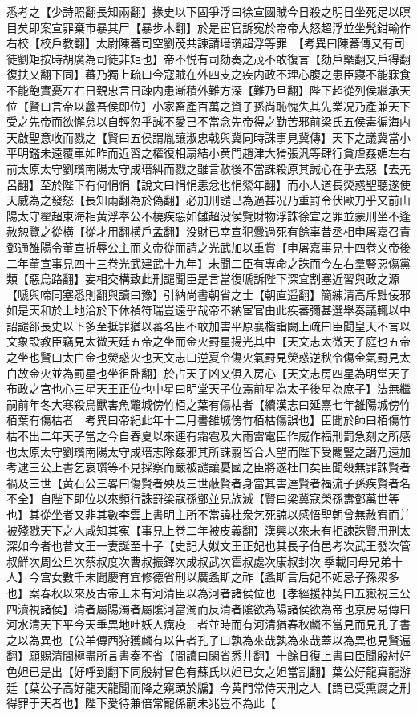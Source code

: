 悉考之【少詩照翻長知兩翻】掾史以下固爭浮曰徐宣國賊今日殺之明日坐死足以瞑目矣即案宣罪棄市暴其尸【暴步木翻】於是宦官訴寃於帝帝大怒超浮並坐髠鉗輸作右校【校戶教翻】太尉陳蕃司空劉茂共諫請瑨瓆超浮等罪　【考異曰陳蕃傳又有司徒劉矩按時胡廣為司徒非矩也】帝不悦有司劾奏之茂不敢復言【劾戶槩翻又戶得翻復扶又翻下同】蕃乃獨上疏曰今寇賊在外四支之疾内政不理心腹之患臣寢不能寐食不能飽實憂左右日親忠言日疎内患漸積外難方深【難乃旦翻】陛下超從列侯繼承天位【賢曰言帝以蠡吾侯即位】小家畜產百萬之資子孫尚恥愧失其先業况乃產兼天下受之先帝而欲懈怠以自輕忽乎誠不愛已不當念先帝得之勤苦邪前梁氏五侯毒徧海内天啟聖意收而戮之【賢曰五侯謂胤讓淑忠戟與冀同時誅事見冀傳】天下之議冀當小平明鑑未遠覆車如昨而近習之權復相扇結小黄門趙津大猾張汎等肆行貪虐姦媚左右前太原太守劉瓆南陽太守成瑨糾而戮之雖言赦後不當誅殺原其誠心在乎去惡【去羌呂翻】至於陛下有何悁悁【說文曰悁悁恚忿也悁縈年翻】而小人道長熒惑聖聽遂使天威為之發怒【長知兩翻為於偽翻】必加刑譴已為過甚况乃重罸令伏歐刀乎又前山陽太守翟超東海相黄浮奉公不橈疾惡如讎超没侯覽財物浮誅徐宣之罪並蒙刑坐不逢赦恕覽之從横【從才用翻横戶孟翻】没財已幸宣犯釁過死有餘辜昔丞相申屠嘉召責鄧通雒陽令董宣折辱公主而文帝從而請之光武加以重賞【申屠嘉事見十四卷文帝後二年董宣事見四十三卷光武建武十九年】未聞二臣有專命之誅而今左右羣豎惡傷黨類【惡烏路翻】妄相交構致此刑譴聞臣是言當復嗁訴陛下深宜割塞近習與政之源【嗁與啼同塞悉則翻與讀曰豫】引納尚書朝省之士【朝直遥翻】簡練清高斥黜佞邪如是天和於上地洽於下休禎符瑞豈遠乎哉帝不納宦官由此疾蕃彌甚選舉奏議輒以中詔譴郤長史以下多至抵罪猶以蕃名臣不敢加害平原襄楷詣闕上疏曰臣聞皇天不言以文象設教臣竊見太微天廷五帝之坐而金火罸星揚光其中【天文志太微天子庭也五帝之坐也賢曰太白金也熒惑火也天文志曰逆夏令傷火氣罸見熒惑逆秋令傷金氣罸見太白故金火並為罰星也坐徂卧翻】於占天子凶又俱入房心【天文志房四星為明堂天子布政之宫也心三星天王正位也中星曰明堂天子位焉前星為太子後星為庶子】法無繼嗣前年冬大寒殺鳥獸害魚鼈城傍竹栢之葉有傷枯者【續漢志曰延熹七年雒陽城傍竹栢葉有傷枯者　考異曰帝紀此年十二月書雒城傍竹栢枯傷誤也】臣聞於師曰栢傷竹枯不出二年天子當之今自春夏以來連有霜雹及大雨雷電臣作威作福刑罰急刻之所感也太原太守劉瓆南陽太守成瑨志除姦邪其所誅翦皆合人望而陛下受閹豎之譖乃遠加考逮三公上書乞哀瓆等不見採察而嚴被譴讓憂國之臣將遂杜口矣臣聞殺無罪誅賢者禍及三世【黄石公三畧曰傷賢者殃及三世蔽賢者身當其害達賢者福流子孫疾賢者名不全】自陛下即位以來頻行誅罸梁寇孫鄧並見族滅【賢曰梁冀寇榮孫夀鄧萬世等也】其從坐者又非其數李雲上書明主所不當諱杜衆乞死諒以感悟聖朝曾無赦宥而并被殘戮天下之人咸知其寃【事見上卷二年被皮義翻】漢興以來未有拒諫誅賢用刑太深如今者也昔文王一妻誕至十子【史記大姒文王正妃也其長子伯邑考次武王發次管叔鮮次周公旦次蔡叔度次曹叔振鐸次成叔武次霍叔處次康叔封次季載同母兄弟十人】今宫女數千未聞慶育宜修德省刑以廣螽斯之祚【螽斯言后妃不妬忌子孫衆多也】案春秋以來及古帝王未有河清臣以為河者諸侯位也【孝經援神契曰五嶽視三公四瀆視諸侯】清者屬陽濁者屬隂河當濁而反清者隂欲為陽諸侯欲為帝也京房易傳曰河水清天下平今天垂異地吐妖人癘疫三者並時而有河清猶春秋麟不當見而見孔子書之以為異也【公羊傳西狩獲麟有以告者孔子曰孰為來哉孰為來哉蓋以為異也見賢遍翻】願賜清間極盡所言書奏不省【間讀曰閑省悉井翻】十餘日復上書曰臣聞殷紂好色妲已是出【好呼到翻下同殷紂冒色有蘇氏以妲已女之妲當割翻】葉公好龍真龍游廷【葉公子高好龍天龍聞而降之窺頭於牖】今黄門常侍天刑之人【謂已受熏腐之刑得罪于天者也】陛下愛待兼倍常寵係嗣未兆豈不為此【